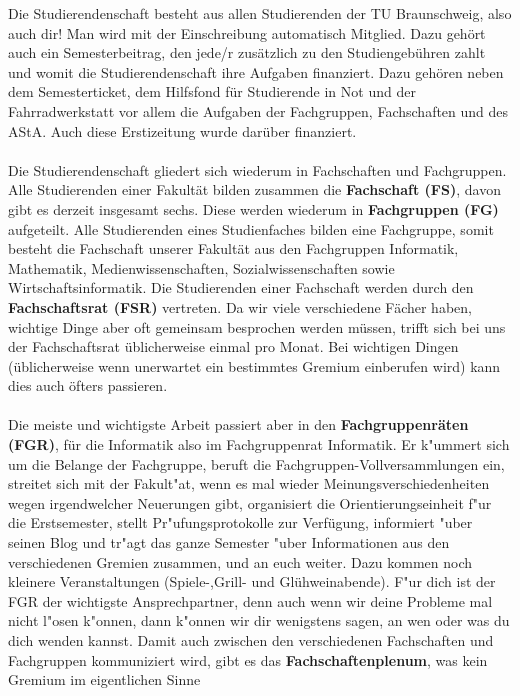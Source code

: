 Die Studierendenschaft besteht aus allen Studierenden der TU Braunschweig, also auch dir!
Man wird mit der Einschreibung automatisch Mitglied. Dazu gehört auch ein Semesterbeitrag, den jede/r 
zusätzlich zu den Studiengebühren zahlt und womit die Studierendenschaft ihre Aufgaben finanziert. 
Dazu gehören neben dem Semesterticket, dem Hilfsfond für Studierende in Not und der 
Fahrradwerkstatt vor allem die Aufgaben der Fachgruppen, Fachschaften und des AStA. Auch diese
Erstizeitung wurde darüber finanziert.
\\
\\
Die Studierendenschaft gliedert sich wiederum in Fachschaften und Fachgruppen.
Alle Studierenden einer Fakultät bilden zusammen die \textbf{Fachschaft (FS)}, davon gibt es derzeit insgesamt sechs.
Diese werden wiederum in  \textbf{Fachgruppen (FG)} aufgeteilt. Alle Studierenden eines Studienfaches bilden eine Fachgruppe, 
somit besteht die Fachschaft unserer Fakultät aus den Fachgruppen Informatik, Mathematik, Medienwissenschaften, Sozialwissenschaften sowie 
Wirtschaftsinformatik. Die Studierenden einer Fachschaft werden  durch den 
\textbf{Fachschaftsrat (FSR)} vertreten. Da wir viele verschiedene Fächer haben, wichtige Dinge aber oft gemeinsam besprochen werden müssen,
trifft sich bei uns der Fachschaftsrat üblicherweise einmal pro Monat. 
Bei wichtigen Dingen (üblicherweise wenn unerwartet ein bestimmtes Gremium einberufen wird) kann dies auch öfters passieren.
\\
\\
Die meiste und wichtigste Arbeit passiert aber in den \textbf{Fachgruppenräten (FGR)}, 
für die Informatik also im Fachgruppenrat Informatik. Er k"ummert sich um die Belange der
Fachgruppe, beruft die Fachgruppen-Vollversammlungen ein, streitet sich mit der
Fakult"at, wenn es mal wieder Meinungsverschiedenheiten wegen irgendwelcher 
Neuerungen gibt, organisiert die Orientierungseinheit f"ur die Erstsemester, stellt Pr"ufungsprotokolle 
zur Verfügung, informiert 
"uber seinen Blog \fginfoUrl
 und tr"agt das ganze Semester "uber 
Informationen aus den verschiedenen Gremien zusammen, und an euch weiter.
Dazu kommen noch kleinere Veranstaltungen (Spiele-,Grill- und Glühweinabende).
F"ur dich ist der FGR der wichtigste Ansprechpartner, denn auch wenn wir deine Probleme mal nicht l"osen 
k"onnen, dann k"onnen wir dir wenigstens sagen, an wen oder was du dich wenden 
kannst. Damit auch zwischen den verschiedenen Fachschaften
und Fachgruppen kommuniziert wird, 
gibt es das \textbf{Fachschaftenplenum}, was kein Gremium im eigentlichen Sinne 
